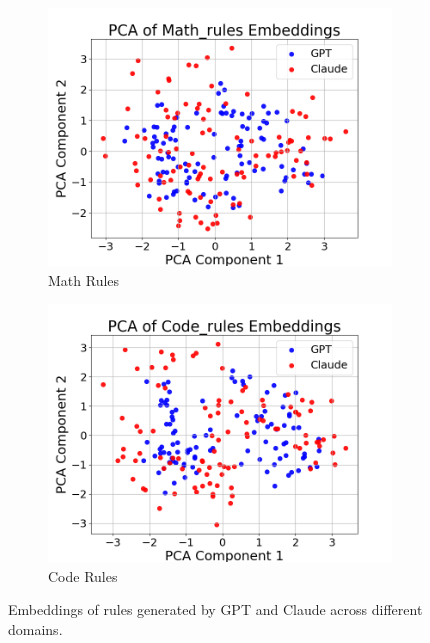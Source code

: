 \documentclass{article}
\begin{document}
\begin{figure}[ht]
    \bigskip %
    \begin{subfigure}[b]{0.32\textwidth}
        \centering
        \includegraphics[width=\textwidth]{figures/PCA_plots/Math_rules_embeddings.png}
        \caption{Math Rules}
        \label{fig:math_rules}
    \end{subfigure}
    \begin{subfigure}[b]{0.32\textwidth}
        \centering
        \includegraphics[width=\textwidth]{figures/PCA_plots/Code_rules_embeddings.png}
        \caption{Code Rules}
        \label{fig:code_rules}
    \end{subfigure}
    \caption{Embeddings of rules generated by GPT and Claude across different domains.}
    \label{fig:rules_embeddings}
\end{figure}
\end{document}
